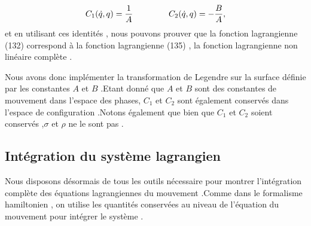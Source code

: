 \documentclass[12pt,a4paper, openany]{article}
\begin{document}
		\begin{equation}
			C_1(\dot{q}, q )=\frac{1}{A} \hspace{1.5cm} 	C_2(\dot{q}, q )=-\frac{B}{A} ,
		\end{equation} 
	   et en utilisant ces identités , nous pouvons prouver que la fonction lagrangienne (132) correspond à la fonction lagrangienne (135) , la fonction lagrangienne non linéaire complète .
	   
	   Nous avons donc implémenter la transformation de Legendre sur la surface définie par les constantes $A$ et $B$ .Etant donné que $A$ et $B$ sont des constantes de mouvement dans l'espace des phases, $C_1$ et $C_2$ sont également conservés dans l'espace de configuration .Notons également que bien que  $C_1$ et $C_2$ soient conservés ,$\sigma$ et $\rho$ ne le sont pas .
	   \subsection{Intégration du système lagrangien}
	   Nous disposons désormais de tous les outils nécessaire pour montrer l'intégration complète des équations lagrangiennes du mouvement .Comme dans le formalisme hamiltonien , on utilise les quantités conservées au niveau de l'équation du mouvement pour intégrer le système .
	   
\end{document}
